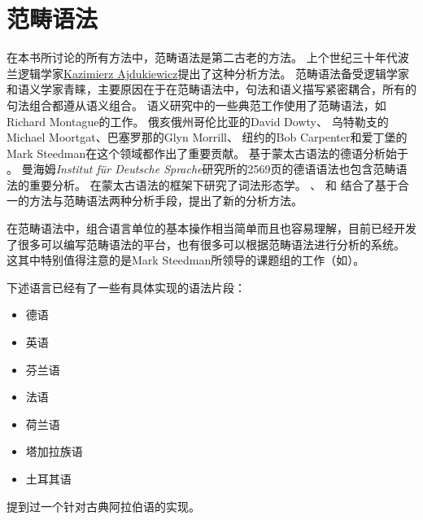 
\chapter{范畴语法}
\label{Kapitel-CG}\label{chap-CG}

在本书所讨论的所有方法中，范畴语法是第二古老的方法。
上个世纪三十年代波兰逻辑学家\href{http://en.wikipedia.org/wiki/Kazimierz_Ajdukiewicz}{Kazimierz Ajdukiewicz}提出了这种分析方法\citep{Ajdukiewicz35a-u}。
范畴语法备受逻辑学家和语义学家青睐，主要原因在于在范畴语法中，句法和语义描写紧密耦合，所有的句法组合都遵从语义组合。
语义研究中的一些典范工作使用了范畴语法，如Richard Montague\citeyearpar{Montague74a-u}的工作。
俄亥俄州哥伦比亚的David Dowty\citeyearpar{Dowty79a}、 
乌特勒支的Michael Moortgat\citeyearpar{Moortgat89a-u}、巴塞罗那的Glyn Morrill\citeyearpar{Morrill94a-u}、
纽约的Bob Carpenter\citeyearpar{Carpenter98a-u}和爱丁堡的Mark Steedman\citeyearpar{Steedman91a,Steedman97a,Steedman2000a-u}在这个领域都作出了重要贡献。
基于蒙太古语法的德语分析始于 。
曼海姆\emph{Institut für Deutsche Sprache}研究所的2569页的德语语法\citep*{IDS97-not-crossreferenced}也包含范畴语法的重要分析。
 \citet{Fanselow81a-u}在蒙太古语法的框架下研究了词法形态学。
 \citet{Uszkoreit86d}、 \citet{Karttunen86a,Karttunen89a-u}和 \citet*{CKZ88a}结合了基于合一的方法与范畴语法两种分析手段，提出了新的分析方法。

在范畴语法中，组合语言单位的基本操作相当简单而且也容易理解，目前已经开发了很多可以编写范畴语法的平台，也有很多可以根据范畴语法进行分析的系统\citep*{YK90a-u,Carpenter1994a-u,BvN94a-u,Llore1995a-u,KoenigE99a-u,Moot2002a-u,WB2003a-u,BCPW2007a,Morrill2012a}。
这其中特别值得注意的是Mark Steedman所领导的课题组的工作（如\citealp*{CHS2002a-u,CC2007a-u}）。

下述语言已经有了一些有具体实现的语法片段：
\begin{itemize}
\item 德语\citep*{Uszkoreit86d,KoenigE99a-u,VHE2003a,VTBS2011a}
\item 英语 \citep{Villavicencio2002a,Baldridge2002a-u,Beavers2002a-u,Beavers2004a-u}
\item 芬兰语 \citep{Karttunen89a-u}
\item 法语 \citep*{BBCG87a-u}
\item 荷兰语 \citep{BvN94a-u,Baldridge2002a-u}
\item 塔加拉族语 \citep{Baldridge2002a-u}
\item 土耳其语 \citep{Hoffmann95a-u,Baldridge2002a-u}
\end{itemize}
 \citet*[]{BCPW2007a}提到过一个针对古典阿拉伯语的实现。


